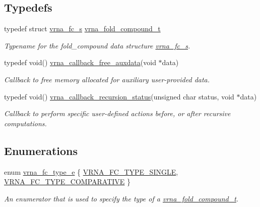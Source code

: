 \subsection*{Typedefs}
\begin{DoxyCompactItemize}
\item 
typedef struct \mbox{\hyperlink{group__fold__compound_structvrna__fc__s}{vrna\+\_\+fc\+\_\+s}} \mbox{\hyperlink{group__fold__compound_ga1b0cef17fd40466cef5968eaeeff6166}{vrna\+\_\+fold\+\_\+compound\+\_\+t}}
\begin{DoxyCompactList}\small\item\em Typename for the fold\+\_\+compound data structure \mbox{\hyperlink{group__fold__compound_structvrna__fc__s}{vrna\+\_\+fc\+\_\+s}}. \end{DoxyCompactList}\item 
typedef void() \mbox{\hyperlink{group__fold__compound_ga7806651f51b195013839a218b3bbd5a3}{vrna\+\_\+callback\+\_\+free\+\_\+auxdata}}(void $\ast$data)
\begin{DoxyCompactList}\small\item\em Callback to free memory allocated for auxiliary user-\/provided data. \end{DoxyCompactList}\item 
typedef void() \mbox{\hyperlink{group__fold__compound_gac86036fa8cad1108832335063243cdc8}{vrna\+\_\+callback\+\_\+recursion\+\_\+status}}(unsigned char status, void $\ast$data)
\begin{DoxyCompactList}\small\item\em Callback to perform specific user-\/defined actions before, or after recursive computations. \end{DoxyCompactList}\end{DoxyCompactItemize}
\subsection*{Enumerations}
\begin{DoxyCompactItemize}
\item 
enum \mbox{\hyperlink{group__fold__compound_ga01a4ff86fa71deaaa5d1abbd95a1447d}{vrna\+\_\+fc\+\_\+type\+\_\+e}} \{ \mbox{\hyperlink{group__fold__compound_gga01a4ff86fa71deaaa5d1abbd95a1447da7e264dd3cf2dc9b6448caabcb7763cd6}{V\+R\+N\+A\+\_\+\+F\+C\+\_\+\+T\+Y\+P\+E\+\_\+\+S\+I\+N\+G\+LE}}, 
\mbox{\hyperlink{group__fold__compound_gga01a4ff86fa71deaaa5d1abbd95a1447dab821ce46ea3cf665be97df22a76f5023}{V\+R\+N\+A\+\_\+\+F\+C\+\_\+\+T\+Y\+P\+E\+\_\+\+C\+O\+M\+P\+A\+R\+A\+T\+I\+VE}}
 \}
\begin{DoxyCompactList}\small\item\em An enumerator that is used to specify the type of a \mbox{\hyperlink{group__fold__compound_ga1b0cef17fd40466cef5968eaeeff6166}{vrna\+\_\+fold\+\_\+compound\+\_\+t}}. \end{DoxyCompactList}\end{DoxyCompactItemize}
